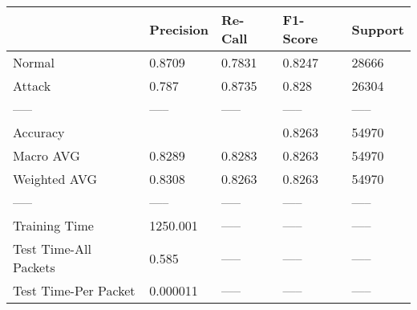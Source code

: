 \begin{tabular}{lllll}
\toprule
{} & Precision & Re-Call & F1-Score & Support \\
\midrule
Normal                &    0.8709 &  0.7831 &   0.8247 &   28666 \\
Attack                &     0.787 &  0.8735 &    0.828 &   26304 \\
-----                 &     ----- &   ----- &    ----- &   ----- \\
Accuracy              &           &         &   0.8263 &   54970 \\
Macro AVG             &    0.8289 &  0.8283 &   0.8263 &   54970 \\
Weighted AVG          &    0.8308 &  0.8263 &   0.8263 &   54970 \\
-----                 &     ----- &   ----- &    ----- &   ----- \\
Training Time         &  1250.001 &   ----- &    ----- &   ----- \\
Test Time-All Packets &     0.585 &   ----- &    ----- &   ----- \\
Test Time-Per Packet  &  0.000011 &   ----- &    ----- &   ----- \\
\bottomrule
\end{tabular}
